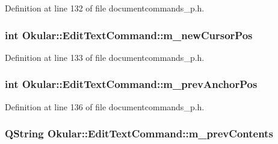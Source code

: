 Definition at line 132 of file documentcommands\+\_\+p.\+h.

\hypertarget{classOkular_1_1EditTextCommand_abe7c2c72e0caeffbd4c5abfd7e375548}{
\subsubsection[{m\+\_\+new\+Cursor\+Pos}]{\setlength{\rightskip}{0pt plus 5cm}int Okular\+::\+Edit\+Text\+Command\+::m\+\_\+new\+Cursor\+Pos\hspace{0.3cm}{\ttfamily [protected]}}}\label{classOkular_1_1EditTextCommand_abe7c2c72e0caeffbd4c5abfd7e375548}


Definition at line 133 of file documentcommands\+\_\+p.\+h.

\hypertarget{classOkular_1_1EditTextCommand_afe5d2bc5003ae94ec364eeabd5789e64}{
\subsubsection[{m\+\_\+prev\+Anchor\+Pos}]{\setlength{\rightskip}{0pt plus 5cm}int Okular\+::\+Edit\+Text\+Command\+::m\+\_\+prev\+Anchor\+Pos\hspace{0.3cm}{\ttfamily [protected]}}}\label{classOkular_1_1EditTextCommand_afe5d2bc5003ae94ec364eeabd5789e64}


Definition at line 136 of file documentcommands\+\_\+p.\+h.

\hypertarget{classOkular_1_1EditTextCommand_a461d065fa44222a7c94a23ce2df39188}{
\subsubsection[{m\+\_\+prev\+Contents}]{\setlength{\rightskip}{0pt plus 5cm}Q\+String Okular\+::\+Edit\+Text\+Command\+::m\+\_\+prev\+Contents\hspace{0.3cm}{\ttfamily [protected]}}}\label{classOkular_1_1EditTextCommand_a461d065fa44222a7c94a23ce2df39188}


